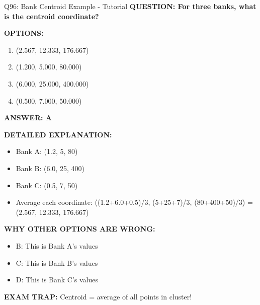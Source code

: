 \documentclass[8pt]{beamer}
\begin{document}
	\begin{frame}{Q96: Bank Centroid Example - Tutorial}
		\fontsize{6.5}{7.5}\selectfont
		\textbf{QUESTION: For three banks, what is the centroid coordinate?}
		
		\vspace{0.1cm}
		\textbf{OPTIONS:}
		\begin{enumerate}
			\item (2.567, 12.333, 176.667)
			\item (1.200, 5.000, 80.000)
			\item (6.000, 25.000, 400.000)
			\item (0.500, 7.000, 50.000)
		\end{enumerate}
		
		\vspace{0.1cm}
		\textcolor{myblue}{\textbf{ANSWER: A}}
		
		\vspace{0.1cm}
		\textbf{DETAILED EXPLANATION:}
		\begin{itemize}
			\item Bank A: (1.2, 5, 80)
			\item Bank B: (6.0, 25, 400)
			\item Bank C: (0.5, 7, 50)
			\item Average each coordinate: ((1.2+6.0+0.5)/3, (5+25+7)/3, (80+400+50)/3) = (2.567, 12.333, 176.667)
		\end{itemize}
		
		\vspace{0.1cm}
		\textcolor{myred}{\textbf{WHY OTHER OPTIONS ARE WRONG:}}
		\begin{itemize}
			\item \textcolor{myred}{B:} This is Bank A's values
			\item \textcolor{myred}{C:} This is Bank B's values
			\item \textcolor{myred}{D:} This is Bank C's values
		\end{itemize}
		
		\textcolor{myred}{\textbf{EXAM TRAP:}} Centroid = \textcolor{myblue}{average of all points in cluster}!
	\end{frame}
	
\end{document}
